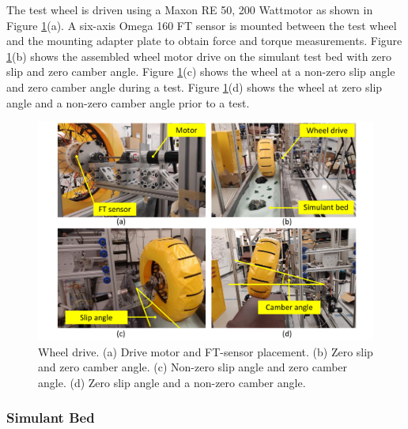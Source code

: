 \documentclass{article}
\begin{document}
The test wheel is driven using a Maxon RE 50, 200 Wattmotor as shown in Figure \ref{fig:wheel-drive}(a). A six-axis Omega 160 FT sensor is mounted between the test wheel and the mounting adapter plate to obtain force and torque measurements. Figure \ref{fig:wheel-drive}(b) shows the assembled wheel motor drive on the simulant test bed with zero slip and zero camber angle. Figure \ref{fig:wheel-drive}(c) shows the wheel at a non-zero slip angle and zero camber angle during a test. Figure \ref{fig:wheel-drive}(d) shows the wheel at zero slip angle and a non-zero camber angle prior to a test.
\label{subsubsec:wheel-drive}
\begin{figure}[hbt!]
\centering
\includegraphics[width=6.00in]{test-rig-images/wheel-drive.pdf}
\caption{Wheel drive. (a) Drive motor and FT-sensor placement. (b) Zero slip and zero camber angle. (c) Non-zero slip angle and zero camber angle. (d) Zero slip angle and a non-zero camber angle.}
\label{fig:wheel-drive}
\end{figure}


\subsubsection{Simulant Bed}
\label{subsubsec:simulant-bed}
\end{document}
